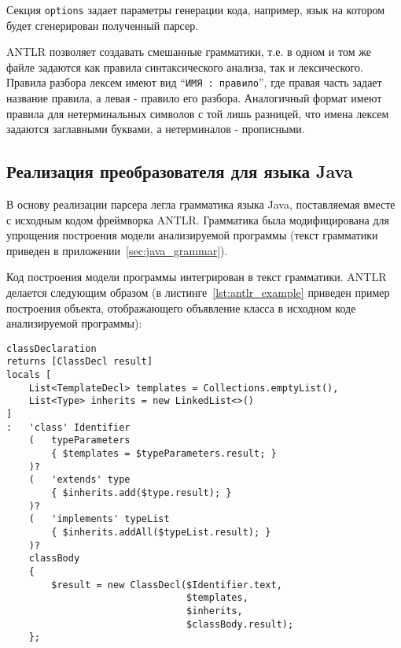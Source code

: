 Секция \texttt{options} задает параметры генерации кода, например, язык на
котором будет сгенерирован полученный парсер.

ANTLR позволяет создавать смешанные грамматики, т.е. в одном и том же файле
задаются как правила синтаксического анализа, так и лексического. Правила
разбора лексем имеют вид ``\texttt{ИМЯ : правило}'', где правая часть задает
название правила, а левая - правило его разбора. Аналогичный формат имеют
правила для нетерминальных символов с той лишь разницей, что имена лексем
задаются заглавными буквами, а нетерминалов - прописными.

\subsection{Реализация преобразователя для языка Java}

В основу реализации парсера легла грамматика языка Java, поставляемая вместе с
исходным кодом фреймворка ANTLR. Грамматика была модифицирована для упрощения
построения модели анализируемой программы (текст грамматики приведен в
приложении~\ref{sec:java_grammar}).

Код построения модели программы интегрирован в текст грамматики. ANTLR
делается следующим образом (в листинге~\ref{lst:antlr_example} приведен пример
построения объекта, отображающего объявление класса в исходном коде
анализируемой программы):

\begin{lstlisting}[label={lst:antlr_example}, caption={Пример построения модели}]
classDeclaration
returns [ClassDecl result]
locals [
    List<TemplateDecl> templates = Collections.emptyList(),
    List<Type> inherits = new LinkedList<>()
]
:   'class' Identifier
    (   typeParameters
        { $templates = $typeParameters.result; }
    )?
    (   'extends' type
        { $inherits.add($type.result); }
    )?
    (   'implements' typeList
        { $inherits.addAll($typeList.result); }
    )?
    classBody
    {
        $result = new ClassDecl($Identifier.text,
                                $templates,
                                $inherits,
                                $classBody.result);
    };
\end{lstlisting}

